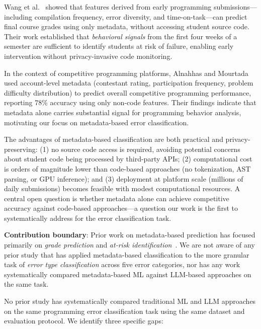 \documentclass[10pt,a4paper]{article}
\begin{document}
Wang et al.~\cite{wang2017learning} showed that features derived from early
programming submissions---including compilation frequency, error diversity,
and time-on-task---can predict final course grades using only metadata,
without accessing student source code. Their work established that
\textit{behavioral signals} from the first four weeks of a semester
are sufficient to identify students at risk of failure, enabling early
intervention without privacy-invasive code monitoring.

In the context of competitive programming platforms, Alnahhas and
Mourtada~\cite{alnahhas2020predicting} used account-level metadata (contestant
rating, participation frequency, problem difficulty distribution) to predict
overall competitive programming performance, reporting 78\% accuracy using
only non-code features. Their findings indicate that metadata alone carries
substantial signal for programming behavior analysis, motivating our focus on
metadata-based error classification.

The advantages of metadata-based classification are both practical and
privacy-preserving: (1) no source code access is required, avoiding
potential concerns about student code being processed by third-party APIs;
(2) computational cost is orders of magnitude lower than code-based
approaches (no tokenization, AST parsing, or GPU inference); and
(3) deployment at platform scale (millions of daily submissions) becomes
feasible with modest computational resources. A central open question
is whether metadata alone can achieve competitive accuracy against
code-based approaches---a question our work is the first to systematically
address for the error classification task.

\noindent\textbf{Contribution boundary}: Prior work on metadata-based prediction
has focused primarily on \textit{grade prediction} and \textit{at-risk
identification}~\cite{wang2017learning,pears2007survey}. We are not aware of
any prior study that has applied metadata-based classification to the more
granular task of \textit{error type classification} across five error
categories, nor has any work systematically compared metadata-based ML against
LLM-based approaches on the same task.

No prior study has systematically compared traditional ML and
LLM approaches on the same programming error classification task using the
same dataset and evaluation protocol. We identify three specific gaps:
\end{document}
